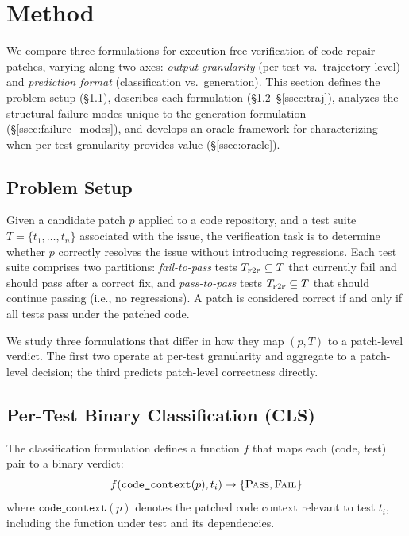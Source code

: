 
\section{Method}
\label{sec:method}

We compare three formulations for execution-free verification of code repair patches, varying along two axes: \emph{output granularity} (per-test vs.\ trajectory-level) and \emph{prediction format} (classification vs.\ generation). This section defines the problem setup (\S\ref{ssec:problem}), describes each formulation (\S\ref{ssec:cls}--\S\ref{ssec:traj}), analyzes the structural failure modes unique to the generation formulation (\S\ref{ssec:failure_modes}), and develops an oracle framework for characterizing when per-test granularity provides value (\S\ref{ssec:oracle}).

\subsection{Problem Setup}
\label{ssec:problem}

Given a candidate patch $p$ applied to a code repository, and a test suite $T = \{t_1, \ldots, t_n\}$ associated with the issue, the verification task is to determine whether $p$ correctly resolves the issue without introducing regressions.
Each test suite comprises two partitions: \emph{fail-to-pass} tests $T_{\textsc{f2p}} \subseteq T$ that currently fail and should pass after a correct fix, and \emph{pass-to-pass} tests $T_{\textsc{p2p}} \subseteq T$ that should continue passing (i.e., no regressions).
A patch is considered correct if and only if all tests pass under the patched code.

We study three formulations that differ in how they map $(p, T)$ to a patch-level verdict. The first two operate at per-test granularity and aggregate to a patch-level decision; the third predicts patch-level correctness directly.

\subsection{Per-Test Binary Classification (CLS)}
\label{ssec:cls}

The classification formulation defines a function $f$ that maps each (code, test) pair to a binary verdict:
\begin{equation}
    f(\texttt{code\_context}(p), t_i) \rightarrow \{\textsc{Pass}, \textsc{Fail}\}
    \label{eq:cls}
\end{equation}
where $\texttt{code\_context}(p)$ denotes the patched code context relevant to test $t_i$, including the function under test and its dependencies.

